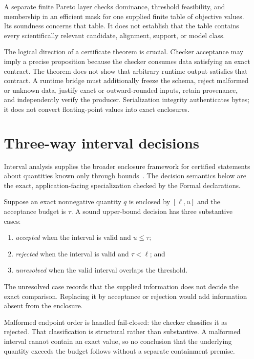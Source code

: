 A separate finite Pareto layer checks dominance, threshold feasibility, and membership
in an efficient mask for one supplied finite table of objective values.  Its soundness
concerns that table.  It does not establish that the table contains every scientifically
relevant candidate, alignment, support, or model class.

The logical direction of a certificate theorem is crucial.  Checker acceptance may
imply a precise proposition because the checker consumes data satisfying an exact
contract.  The theorem does not show that arbitrary runtime output satisfies that
contract.  A runtime bridge must additionally freeze the schema, reject malformed or
unknown data, justify exact or outward-rounded inputs, retain provenance, and
independently verify the producer.  Serialization integrity authenticates bytes; it
does not convert floating-point values into exact enclosures.

\section{Three-way interval decisions}

Interval analysis supplies the broader enclosure framework for certified statements
about quantities known only through bounds~\cite{MooreKearfottCloud2009}. The decision
semantics below are the exact, application-facing specialization checked by the Formal
declarations.

Suppose an exact nonnegative quantity $q$ is enclosed by $[\ell,u]$ and the acceptance
budget is $\tau$.  A sound upper-bound decision has three substantive cases:

\begin{enumerate}
  \item \emph{accepted} when the interval is valid and $u\leq\tau$;
  \item \emph{rejected} when the interval is valid and $\tau<\ell$; and
  \item \emph{unresolved} when the valid interval overlaps the threshold.
\end{enumerate}

The unresolved case records that the supplied information does not decide the exact
comparison.  Replacing it by acceptance or rejection would add information absent from
the enclosure.

Malformed endpoint order is handled fail-closed: the checker classifies it as rejected.
That classification is structural rather than substantive.  A malformed interval
cannot contain an exact value, so no conclusion that the underlying quantity exceeds
the budget follows without a separate containment premise.

